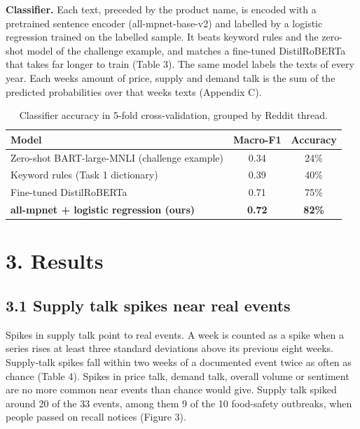 \documentclass[
  11pt,
]{article}
\begin{document}
\textbf{Classifier.} Each text, preceded by the product name, is encoded
with a pretrained sentence encoder (all-mpnet-base-v2) and labelled by a
logistic regression trained on the labelled sample. It beats keyword rules and
the zero-shot model of the challenge example, and matches a fine-tuned
DistilRoBERTa that takes far longer to train (Table 3). The
same model labels the texts of every year. Each
week\textquotesingle s amount of price, supply and demand talk is the
sum of the predicted probabilities over that week\textquotesingle s
texts (Appendix C).

\begin{table}[htbp]
\centering\small
\caption{Classifier accuracy in 5-fold cross-validation, grouped by Reddit thread.}
\begin{tabular}{lcc}
\toprule
Model & Macro-F1 & Accuracy \\
\midrule
Zero-shot BART-large-MNLI (challenge example) & 0.34 & 24\% \\
Keyword rules (Task 1 dictionary) & 0.39 & 40\% \\
Fine-tuned DistilRoBERTa & 0.71 & 75\% \\
\textbf{all-mpnet + logistic regression (ours)} & \textbf{0.72} & \textbf{82\%} \\
\bottomrule
\end{tabular}
\end{table}

\section{3. Results}\label{results}

\subsection{3.1 Supply talk spikes near real
events}\label{supply-talk-spikes-near-real-events}

Spikes in supply talk point to real events. A week is counted as a spike
when a series rises at least three standard deviations above its previous
eight weeks. Supply-talk spikes fall within two weeks of a documented
event twice as often as chance (Table 4). Spikes in price talk, demand
talk, overall volume or sentiment are no more common near events than
chance would give. Supply talk spiked around 20 of the 33 events, among them 9 of
the 10 food-safety outbreaks, when people passed on recall notices
(Figure 3).
\end{document}
